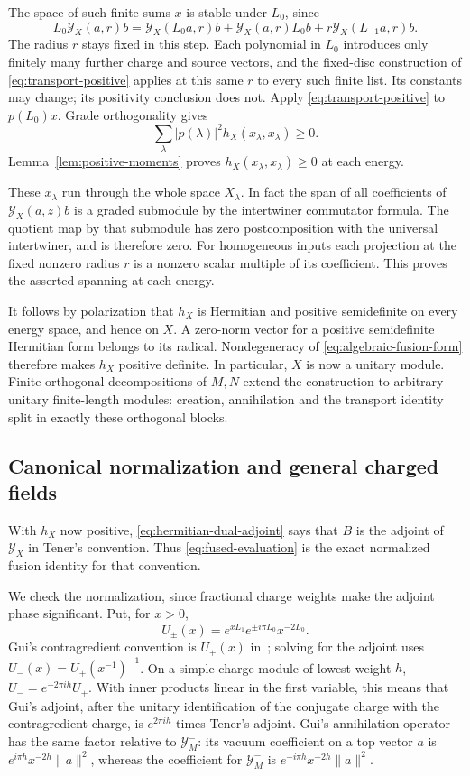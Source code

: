 The space of such finite sums $x$ is stable under $L_0$, since
\begin{equation}
 L_0\mathcal Y_X(a,r)b
 =\mathcal Y_X(L_0a,r)b+\mathcal Y_X(a,r)L_0b
   +r\mathcal Y_X(L_{-1}a,r)b.
 \label{eq:fixed-radius-L0}
\end{equation}
The radius $r$ stays fixed in this step.  Each polynomial in $L_0$
introduces only finitely many further charge and source vectors, and
the fixed-disc construction of \eqref{eq:transport-positive} applies
at this same $r$ to every such finite list.  Its constants may change;
its positivity conclusion does not.
Apply \eqref{eq:transport-positive} to $p(L_0)x$.  Grade
orthogonality gives
\[
 \sum_\lambda |p(\lambda)|^2h_X(x_\lambda,x_\lambda)\geq0.
\]
Lemma~\ref{lem:positive-moments} proves
$h_X(x_\lambda,x_\lambda)\geq0$ at each energy.

These $x_\lambda$ run through the whole space $X_\lambda$.  In
fact the span of all coefficients of $\mathcal Y_X(a,z)b$ is a
graded submodule by the intertwiner commutator formula.  The
quotient map by that submodule has zero postcomposition with the
universal intertwiner, and is therefore zero.  For homogeneous
inputs each projection at the fixed nonzero radius $r$ is a
nonzero scalar multiple of its coefficient.  This proves the
asserted spanning at each energy.

It follows by polarization that $h_X$ is Hermitian and positive
semidefinite on every energy space, and hence on $X$.  A
zero-norm vector for a positive semidefinite Hermitian form belongs
to its radical.  Nondegeneracy of \eqref{eq:algebraic-fusion-form}
therefore makes $h_X$ positive definite.  In particular, $X$ is now
a unitary module.  Finite orthogonal decompositions of $M,N$
extend the construction to arbitrary unitary finite-length
modules: creation, annihilation and the transport identity split
in exactly these orthogonal blocks.

\subsection{Canonical normalization and general charged fields}

With $h_X$ now positive, \eqref{eq:hermitian-dual-adjoint} says
that $B$ is the adjoint of $\mathcal Y_X$ in Tener's convention.
Thus \eqref{eq:fused-evaluation} is the exact normalized
fusion identity for that convention.

We check the normalization, since fractional charge weights make
the adjoint phase significant.  Put, for $x>0$,
\[
 U_\pm(x)=e^{xL_1}e^{\pm i\pi L_0}x^{-2L_0}.
\]
Gui's contragredient convention is
$U_+(x)$ in~\cite[Equations~(8.3)--(8.5)]{GuiPositivity}; solving
for the adjoint uses
$U_-(x)=U_+(x^{-1})^{-1}$.  On a simple charge module of lowest
weight $h$, $U_-=e^{-2\pi i h}U_+$.  With inner products linear in
the first variable, this means that Gui's adjoint, after the
unitary identification of the conjugate charge with the
contragredient charge, is $e^{2\pi i h}$ times Tener's adjoint.
Gui's annihilation operator has the same factor relative to
$\mathcal Y_M^-$: its vacuum coefficient on a top vector $a$ is
$e^{i\pi h}x^{-2h}\|a\|^2$, whereas the coefficient for
$\mathcal Y_M^-$ is $e^{-i\pi h}x^{-2h}\|a\|^2$.

